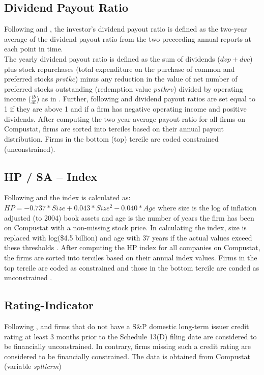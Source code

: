 \documentclass[12pt]{article}
\begin{document}
\begin{appendices}
	\subsection*{Dividend Payout Ratio}
	\noindent Following \citet[p.119]{Khatami2014} and \citet[p.1789]{Almeida2004}, the investor's dividend payout ratio is defined as the two-year average of the dividend payout ratio from the two preceeding annual reports at each point in time.\\
	The yearly dividend payout ratio is defined as the sum of dividends ($dvp+dvc$) plus stock repurchases (total expenditure on the purchase of common and preferred stocks $prstkc$) minus any reduction in the value of net number of preferred stocks outstanding (redemption value $pstkrv$) divided by operating income ($\frac{ib}{at}$) as in \citet[p.369]{Jagannathan2000}. Further, following \citet[p.119]{Khatami2014} and \citet[p.1923]{hadlock2010} dividend payout ratios are set equal to 1 if they are above 1 and if a firm has negative operating income and positive dividends. After computing the two-year average payout ratio for all firms on Compustat, firms are sorted into terciles based on their annual payout distribution. Firms in the bottom (top) tercile are coded constrained (unconstrained). 

	\subsection*{HP / SA -- Index}
	\noindent Following \citet[p.1929]{hadlock2010} and \citet[p.119]{Khatami2014} the index is calculated as: $HP=-0.737*Size+0.043*Size^{2}-0.040*Age$ where size is the log of inflation adjusted (to 2004) book assets and age is the number of years the firm has been on Compustat with a non-missing stock price. In calculating the index, size is replaced with log(\$4.5 billion) and age with 37 years if the actual values exceed these thresholds \citep[p.1929]{hadlock2010}. After computing the HP index for all companies on Compustat, the firms are sorted into terciles based on their annual index values. Firms in the top tercile are coded as constrained and those in the bottom tercile are conded as unconstrained \citep[p.38]{Farre-mensa2013}.
	\pagebreak

	\subsection*{Rating-Indicator}
	\noindent Following \citet[p.18]{heller2015}, \citet[p.1790]{Almeida2004} and \citet[p.38]{Farre-mensa2013} firms that do not have a S\&P domestic long-term issuer credit rating at least 3 months prior to the Schedule 13(D) filing date are considered to be financially unconstrained. In contrary, firms missing such a credit rating are considered to be financially constrained. The data is obtained from Compustat (variable \emph{splticrm})

\end{appendices}
\end{document}

